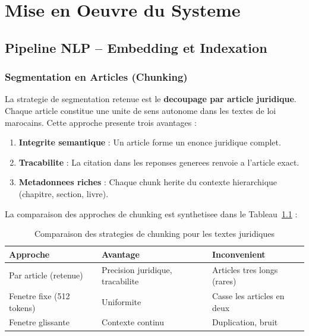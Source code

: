 \chapter{Mise en Oeuvre du Systeme}

\section{Pipeline NLP -- Embedding et Indexation}

\subsection{Segmentation en Articles (Chunking)}

La strategie de segmentation retenue est le \textbf{decoupage par article juridique}. Chaque article constitue une unite de sens autonome dans les textes de loi marocains. Cette approche presente trois avantages :

\begin{enumerate}
    \item \textbf{Integrite semantique} : Un article forme un enonce juridique complet.
    \item \textbf{Tracabilite} : La citation dans les reponses generees renvoie a l'article exact.
    \item \textbf{Metadonnees riches} : Chaque chunk herite du contexte hierarchique (chapitre, section, livre).
\end{enumerate}

La comparaison des approches de chunking est synthetisee dans le Tableau~\ref{tab:chunking-strategies} :

\begin{table}[h]
\centering
\renewcommand{\arraystretch}{1.3}
\begin{tabular}{|l|p{4cm}|p{4cm}|}
\hline
\rowcolor{LightBlue}
\textbf{\color{PrimaryBlue}Approche} & \textbf{\color{PrimaryBlue}Avantage} & \textbf{\color{PrimaryBlue}Inconvenient} \\
\hline
Par article (retenue) & Precision juridique, tracabilite & Articles tres longs (rares) \\
Fenetre fixe (512 tokens) & Uniformite & Casse les articles en deux \\
Fenetre glissante & Contexte continu & Duplication, bruit \\
\hline
\end{tabular}
\caption{Comparaison des strategies de chunking pour les textes juridiques}
\label{tab:chunking-strategies}
\end{table}

